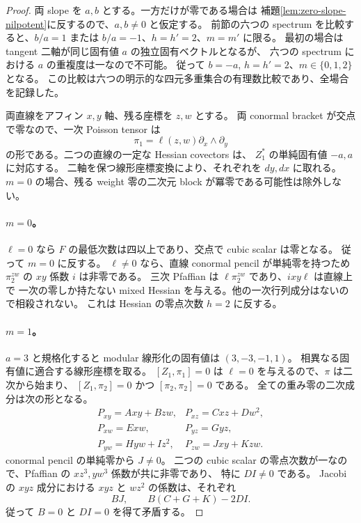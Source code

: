 \documentclass[11pt,a4paper]{ltjsarticle}
\theoremstyle{remark}\newtheorem{remark}[theorem]{注意}
\begin{document}
\begin{proof}
両 slope を $a,b$ とする。一方だけが零である場合は
補題\ref{lem:zero-slope-nilpotent}に反するので、$a,b\ne0$ と仮定する。
前節の六つの spectrum を比較すると、$b/a=1$ または
$b/a=-1$、$h=h'=2$、$m=m'$ に限る。
最初の場合は tangent 二軸が同じ固有値 $a$ の独立固有ベクトルとなるが、
六つの spectrum における $a$ の重複度は一なので不可能。
従って $b=-a$, $h=h'=2$、$m\in\{0,1,2\}$ となる。
この比較は六つの明示的な四元多重集合の有理数比較であり、全場合を記録した。

両直線をアフィン $x,y$ 軸、残る座標を $z,w$ とする。
両 conormal bracket が交点で零なので、一次 Poisson tensor は
\[
 \pi_1=\ell(z,w)\partial_x\wedge\partial_y
\]
の形である。二つの直線の一定な Hessian covectors は、
$Z_1^*$ の単純固有値 $-a,a$ に対応する。
二軸を保つ線形座標変換により、それぞれを $dy,dx$ に取れる。
$m=0$ の場合、残る weight 零の二次元 block が冪零である可能性は除外しない。

\paragraph{$m=0$。}
$\ell=0$ なら $F$ の最低次数は四以上であり、交点で cubic scalar は零となる。
従って $m=0$ に反する。
$\ell\ne0$ なら、直線 conormal pencil が単純零を持つため
$\pi_2^{zw}$ の $xy$ 係数 $i$ は非零である。
三次 Pfaffian は $\ell\pi_2^{zw}$ であり、$i xy\ell$ は直線上で
一次の零しか持たない mixed Hessian を与える。他の一次行列成分はないので相殺されない。
これは Hessian の零点次数 $h=2$ に反する。

\paragraph{$m=1$。}
$a=3$ と規格化すると modular 線形化の固有値は $(3,-3,-1,1)$。
相異なる固有値に適合する線形座標を取る。
$[Z_1,\pi_1]=0$ は $\ell=0$ を与えるので、$\pi$ は二次から始まり、
$[Z_1,\pi_2]=0$ かつ $[\pi_2,\pi_2]=0$ である。
全ての重み零の二次成分は次の形となる。
\[
\begin{array}{ll}
P_{xy}=Axy+Bzw,&P_{xz}=Cxz+Dw^2,\\
P_{xw}=Exw,&P_{yz}=Gyz,\\
P_{yw}=Hyw+Iz^2,&P_{zw}=Jxy+Kzw.
\end{array}
\]
conormal pencil の単純零から $J\ne0$。
二つの cubic scalar の零点次数が一なので、Pfaffian の $xz^3,yw^3$ 係数が共に非零であり、
特に $D I\ne0$ である。
Jacobi の $xyz$ 成分における $xyz$ と $wz^2$ の係数は、それぞれ
\[
 BJ,\qquad B(C+G+K)-2DI.
\]
従って $B=0$ と $DI=0$ を得て矛盾する。


\end{proof}
\end{document}
